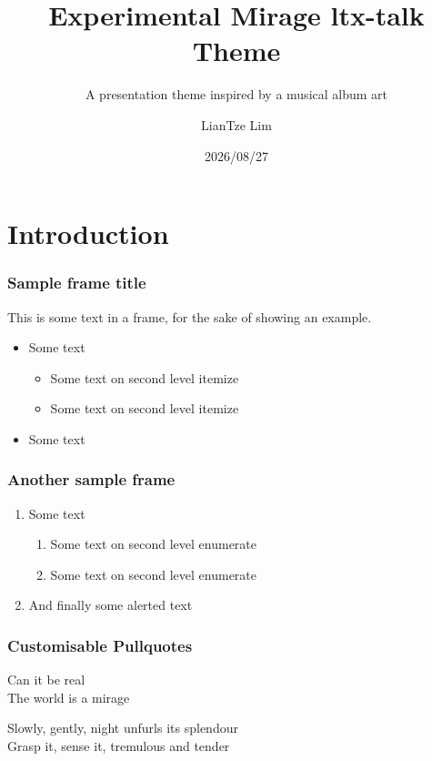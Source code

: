 \documentclass[font-size=12pt]{ltx-talk}
\title{Experimental Mirage ltx-talk Theme}
\subtitle{A presentation theme inspired by a musical album art}
\author{LianTze Lim}
\institute{(Optional) Institute Name}
\date{2026/08/27}
\begin{document}
\maketitle[framestyle = wallpaper] %


\section{Introduction}
\begin{frame}
\frametitle{Sample frame title}
This is some text in a frame, for the sake of showing an example.

\begin{itemize}
    \item Some text
    \begin{itemize}
        \item Some text on second level itemize
        \item Some text on second level itemize
    \end{itemize}
    \item Some text
\end{itemize}
\end{frame}

\begin{frame}
\frametitle{Another sample frame}
\begin{enumerate}
\item Some text
    \begin{enumerate}
        \item Some text on second level enumerate
        \item Some text on second level enumerate
    \end{enumerate}
\item And finally some \alert{alerted text}
\end{enumerate}
\end{frame}

\begin{frame}
\frametitle{Customisable Pullquotes}
\begin{pullquote}
    Can it be real\\
    The world is a mirage
\end{pullquote}

\renewcommand{\MiragePullquoteOpen}{«}
\begin{pullquote}\raggedright
Slowly, gently, night unfurls its splendour\\
Grasp it, sense it, tremulous and tender
\end{pullquote}

\end{frame}
\end{document}
